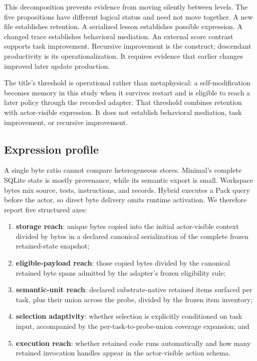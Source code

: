 \documentclass[10pt,twocolumn]{article}
\providecommand{\tightlist}{\setlength{\itemsep}{0pt}\setlength{\parskip}{0pt}}
\begin{document}
This decomposition prevents evidence from moving silently between
levels. The five propositions have different logical status and need not
move together. A new file establishes retention. A serialized lesson
establishes possible expression. A changed trace establishes behavioral
mediation. An external score contrast supports task improvement.
Recursive improvement is the construct; descendant productivity is its
operationalization. It requires evidence that earlier changes improved
later update production.

The title's threshold is operational rather than metaphysical: a
self-modification becomes memory in this study when it survives restart
and is eligible to reach a later policy through the recorded adapter.
That threshold combines retention with actor-visible expression. It does
not establish behavioral mediation, task improvement, or recursive
improvement.

\subsection{Expression profile}\label{expression-profile}

A single byte ratio cannot compare heterogeneous stores. Minimal's
complete SQLite state is mostly provenance, while its semantic export is
small. Workspace bytes mix source, tests, instructions, and records.
Hybrid executes a Pack query before the actor, so direct byte delivery
omits runtime activation. We therefore report five structured axes:

\begin{enumerate}
\def\labelenumi{\arabic{enumi}.}
\tightlist
\item
  \textbf{storage reach}: unique bytes copied into the initial
  actor-visible context divided by bytes in a declared canonical
  serialization of the complete frozen retained-state snapshot;
\item
  \textbf{eligible-payload reach}: those copied bytes divided by the
  canonical retained byte spans admitted by the adapter's frozen
  eligibility rule;
\item
  \textbf{semantic-unit reach}: declared substrate-native retained items
  surfaced per task, plus their union across the probe, divided by the
  frozen item inventory;
\item
  \textbf{selection adaptivity}: whether selection is explicitly
  conditioned on task input, accompanied by the per-task-to-probe-union
  coverage expansion; and
\item
  \textbf{execution reach}: whether retained code runs automatically and
  how many retained invocation handles appear in the actor-visible
  action schema.
\end{enumerate}
\end{document}
